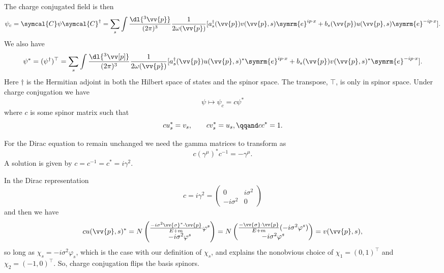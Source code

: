 \documentclass[fleqn]{NotesClass}
\newcommand{\e}{\symrm{e}}
\newcommand{\chargeConjugation}{\symcal{C}}
\newcommand{\hermit}{{\dagger}}
\newcommand{\trans}{{\top}}
\begin{document}
    The charge conjugated field is then
    \begin{equation}
        \psi_c = \chargeConjugation \psi \chargeConjugation^\hermit = \sum_s \int \frac{\dl{^3\vv{p}}}{(2\pi)^3} \frac{1}{2\omega(\vv{p})} [a_s^\hermit(\vv{p})v(\vv{p}, s)\e^{ip\cdot x} + b_s(\vv{p})u(\vv{p}, s)\e^{-ip\cdot x}].
    \end{equation}
    We also have
    \begin{equation}
        \psi^* = (\psi^\hermit)^\trans = \sum_s \int \frac{\dl{^3\vv[p]}}{(2\pi)^3} \frac{1}{2\omega(\vv{p})} [a_s^\hermit(\vv{p})u(\vv{p}, s)^* \e^{ip\cdot x} + b_s(\vv{p}) v(\vv{p}, s)^* \e^{-ip\cdot x}].
    \end{equation}
    Here \(\hermit\) is the Hermitian adjoint in both the Hilbert space of states and the spinor space.
    The transpose, \(\trans\), is only in spinor space.
    Under charge conjugation we have
    \begin{equation}
        \psi \mapsto \psi_c = c\psi^*
    \end{equation}
    where \(c\) is some spinor matrix such that
    \begin{equation}
        cu_s^* = v_s, \qquad cv_s^* = u_s, \qqand cc^* = 1.
    \end{equation}
    
    For the Dirac equation to remain unchanged we need the gamma matrices to transform as
    \begin{equation}
        c (\gamma^\mu)^* c^{-1} = -\gamma^\mu.
    \end{equation}
    A solution is given by \(c = c^{-1} = c^* = i\gamma^2\).
    
    In the Dirac representation
    \begin{equation}
        c = i\gamma^2 =
        \begin{pmatrix}
            0 & i\sigma^2\\
            -i\sigma^2 & 0
        \end{pmatrix}
    \end{equation}
    and then we have
    \begin{equation}
        cu(\vv{p}, s)^* = N
        \begin{pmatrix}
            \frac{-i\sigma^2\vv{\sigma}^* \cdot \vv{p}}{E + m} \varphi^s\\
            -i\sigma^2\varphi^s
        \end{pmatrix}
        = N
        \begin{pmatrix}
            \frac{-\vv{\sigma} \cdot \vv{p}}{E + m}(-i\sigma^2\varphi^s)\\
            -i\sigma^2\varphi^s
        \end{pmatrix}
        = v(\vv{p}, s),
    \end{equation}
    so long as \(\chi_s = -i\sigma^2\varphi_s\), which is the case with our definition of \(\chi_s\), and explains the nonobvious choice of \(\chi_1 = (0, 1)^\trans\) and \(\chi_2 = (-1, 0)^\trans\).
    So, charge conjugation flips the basis spinors.
    
\end{document}
